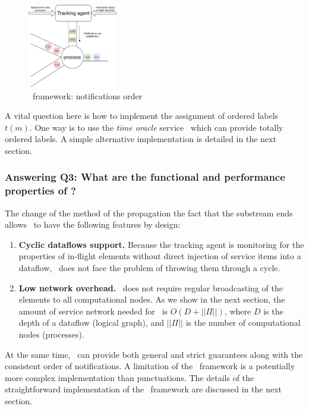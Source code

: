 \begin{figure}[htbp]
  \centering
  \includegraphics[width=0.35\textwidth]{pics/tracker-ordering.pdf}
  \caption{\tracker\ framework: notifications order}
  \label{tracker_ordering}
\end{figure}

A vital question here is how to implement the assignment of ordered labels $t(m)$. One way is to use the {\em time oracle} service~\cite{???} which can provide totally ordered labels. A simple alternative implementation is detailed in the next section. 

\subsubsection{Answering Q3: What are the functional and performance properties of \tracker?}

The change of the method of the propagation the fact that the substream ends allows \tracker\ to have the following features by design:

\begin{enumerate}
    \item {\bf Cyclic dataflows support.} Because the tracking agent is monitoring for the properties of in-flight elements without direct injection of service items into a dataflow, \tracker\ does not face the problem of throwing them through a cycle.
    \item {\bf Low network overhead.} \tracker\ does not require regular broadcasting of the elements to all computational nodes. As we show in the next section, the amount of service network needed for \tracker\ is $O(D+||\Pi||)$, where $D$ is the depth of a dataflow (logical graph), and $||\Pi||$ is the number of computational nodes (processes). 
\end{enumerate}

At the same time, \tracker\ can provide both general and strict guarantees along with the consistent order of notifications. A limitation of the \tracker\ framework is a potentially more complex implementation than punctuations. The details of the straightforward implementation of the \tracker\ framework are discussed in the next section.
